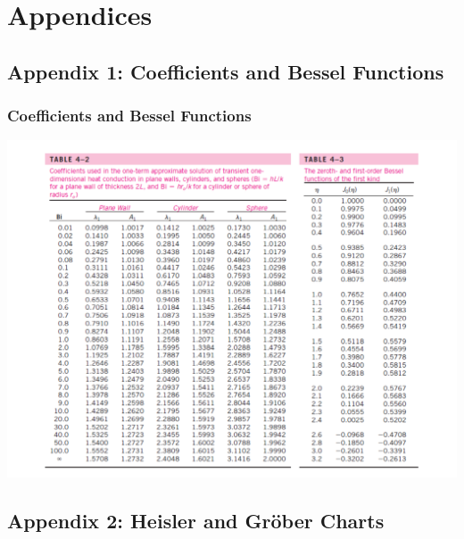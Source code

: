 \documentclass[10pt,compress,unknownkeysallowed]{beamer}
\begin{document}
\section{Appendices}

\subsection{Appendix 1: Coefficients and Bessel Functions}\label{appendix1}
\begin{frame}
 \frametitle{Coefficients and Bessel Functions}
        \begin{center}
          \includegraphics[width=.9\columnwidth,height=.65\columnwidth,clip]{./Pics/BaselFunctionTable}
        \end{center}
\end{frame}




\subsection{Appendix 2: Heisler and Gr\"ober Charts}\label{appendix2}
{
  
}
\end{document}
